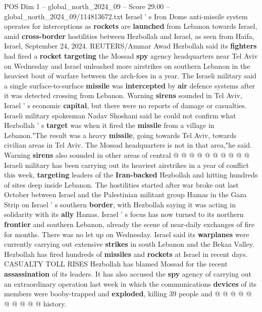 \begin{textsample}{POS Dim 1 – global\_north\_2024\_09 – Score 29.00 – global\_north\_2024\_09/114813672.txt}  \label{ex:f1_pos_098}
Israel ' s Iron Dome anti-missile system operates for interceptions as \textbf{rockets} are \textbf{launched} from Lebanon towards Israel, amid \textbf{cross-border} hostilities between Hezbollah and Israel, as seen from Haifa, Israel, September 24, 2024.
REUTERS/Ammar Awad Hezbollah said its \textbf{fighters} had fired a \textbf{rocket} \textbf{targeting} the Mossad \textbf{spy} agency headquarters near Tel Aviv on Wednesday and Israel unleashed more airstrikes on southern Lebanon in the heaviest bout of warfare between the arch-foes in a year.
The Israeli military said a single surface-to-surface \textbf{missile} was \textbf{intercepted} by \textbf{air} defence systems after it was detected crossing from Lebanon.
Warning \textbf{sirens} sounded in Tel Aviv, Israel ' s economic \textbf{capital}, but there were no reports of damage or casualties.
Israeli military spokesman Nadav Shoshani said he could not confirm what Hezbollah ' s \textbf{target} was when it fired the \textbf{missile} from a village in Lebanon."The result was a heavy \textbf{missile}, going towards Tel Aviv, towards civilian areas in Tel Aviv.
The Mossad headquarters is not in that area,"he said.
Warning \textbf{sirens} also sounded in other areas of central @ @ @ @ @ @ @ @ @ @ Israeli military has been carrying out its heaviest airstrikes in a year of conflict this week, \textbf{targeting} leaders of the \textbf{Iran-backed} Hezbollah and hitting hundreds of sites deep inside Lebanon.
The hostilities started after war broke out last October between Israel and the Palestinian militant group Hamas in the Gaza Strip on Israel ' s southern \textbf{border}, with Hezbollah saying it was acting in solidarity with its \textbf{ally} Hamas.
Israel ' s focus has now turned to its northern \textbf{frontier} and southern Lebanon, already the scene of near-daily exchanges of fire for months.
There was no let up on Wednesday.
Israel said its \textbf{warplanes} were currently carrying out extensive \textbf{strikes} in south Lebanon and the Bekaa Valley.
Hezbollah has fired hundreds of \textbf{missiles} and \textbf{rockets} at Israel in recent days.
CASUALTY TOLL RISES Hezbollah has blamed Mossad for the recent \textbf{assassination} of its leaders.
It has also accused the \textbf{spy} agency of carrying out an extraordinary operation last week in which the communications \textbf{devices} of its members were booby-trapped and \textbf{exploded}, killing 39 people and @ @ @ @ @ @ @ @ @ @ history.

\end{textsample}
